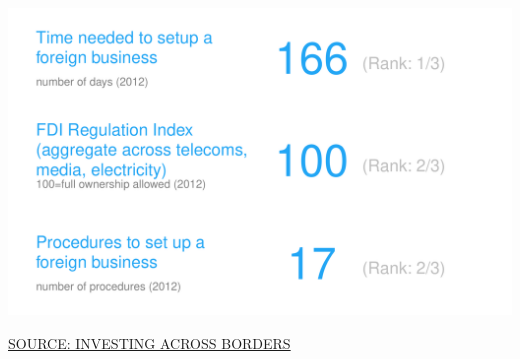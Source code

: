 \documentclass{article}\usepackage[]{graphicx}\usepackage[]{color}
\makeatletter
\def\maxwidth{ %
  \ifdim\Gin@nat@width>\linewidth
    \linewidth
  \else
    \Gin@nat@width
  \fi
}
\makeatother
\begin{document}
\begin{minipage}[c]{0.95\textwidth}
\begin{minipage}[c]{0.43\textwidth}
{\centering \includegraphics[width=\maxwidth]{figure/number_chart_Policy-1} 

}



    \vspace{-2ex}
    \scriptsize{\href{http://iab.worldbank.org/Data/ExploreTopics/Investing-across-sectors}{\textcolor[HTML]{22A6F5}{SOURCE: INVESTING ACROSS BORDERS}}}
  \end{minipage}
\end{minipage}
\end{document}

